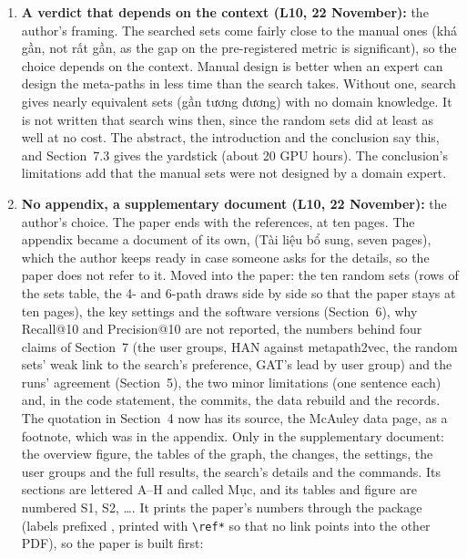 \documentclass[11pt,a4paper]{article}
\DeclareRobustCommand{\code}[1]{\texttt{\detokenize{#1}}}
\newcommand{\vi}[1]{\foreignlanguage{vietnamese}{#1}}
\begin{document}
\begin{enumerate}[label=N\arabic*]
        changed, and the random sets' result is still in the abstract. \code{paper_v2} keeps its
        framing.
  \item \textbf{A verdict that depends on the context (L10, 22 November):} the author's framing. The
        searched sets come fairly close to the manual ones (\vi{khá gần}, not \vi{rất gần}, as the
        gap on the pre-registered metric is significant), so the choice depends on the context.
        Manual design is better when an expert can design the meta-paths in less time than the
        search takes. Without one, search gives nearly equivalent sets (\vi{gần tương đương}) with no
        domain knowledge. It is not written that search wins then, since the random sets did at
        least as well at no cost. The abstract, the introduction and the conclusion say this, and
        Section~7.3 gives the yardstick (about 20 GPU hours). The conclusion's limitations add that
        the manual sets were not designed by a domain expert.
  \item \textbf{No appendix, a supplementary document (L10, 22 November):} the author's choice. The
        paper ends with the references, at ten pages. The appendix became a document of its own,
        \code{supplement_vn.tex} (\vi{Tài liệu bổ sung}, seven pages), which the author keeps ready
        in case someone asks for the details, so the paper does not refer to it. Moved into the
        paper: the ten random sets (rows of the sets table, the 4- and 6-path draws side by side so
        that the paper stays at ten pages), the key settings and the software versions
        (Section~6), why Recall@10 and Precision@10 are not reported, the numbers behind four claims
        of Section~7 (the user groups, HAN against metapath2vec, the random sets' weak link to the
        search's preference, GAT's lead by user group) and the runs' agreement (Section~5), the two
        minor limitations (one sentence each) and, in the code statement, the commits, the data
        rebuild and the records. The quotation in Section~4 now has its source, the McAuley data
        page, as a footnote, which was in the appendix. Only in the supplementary document: the
        overview figure, the tables of the graph, the changes, the settings, the user groups and
        the full results, the search's details and the commands. Its sections are lettered A--H
        and called \vi{Mục}, and its tables and figure are numbered S1, S2, \ldots. It prints the
        paper's numbers through the \code{xr} package (labels prefixed \code{P-}, printed with
        \verb|\ref*| so that no link points into the other PDF), so the paper is built first:

\end{enumerate}
\end{document}
